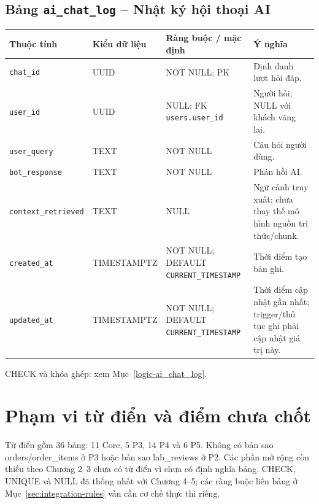\subsection{Bảng \texttt{ai\_\allowbreak{}chat\_\allowbreak{}log} -- Nhật ký hội thoại AI}
\label{dictionary-ai_chat_log}
\begingroup
\footnotesize
\setlength{\tabcolsep}{3pt}
\begin{longtable}{>{\raggedright\arraybackslash}p{3.1cm}>{\raggedright\arraybackslash}p{2.5cm}>{\raggedright\arraybackslash}p{3.7cm}>{\raggedright\arraybackslash}p{4.3cm}}
\toprule
Thuộc tính & Kiểu dữ liệu & Ràng buộc / mặc định & Ý nghĩa \\
\midrule
\endhead
\texttt{chat\_\allowbreak{}id} & UUID & NOT NULL; PK & Định danh lượt hỏi đáp. \\
\texttt{user\_\allowbreak{}id} & UUID & NULL; FK \texttt{users.user\_\allowbreak{}id} & Người hỏi; NULL với khách vãng lai. \\
\texttt{user\_\allowbreak{}query} & TEXT & NOT NULL & Câu hỏi người dùng. \\
\texttt{bot\_\allowbreak{}response} & TEXT & NOT NULL & Phản hồi AI. \\
\texttt{context\_\allowbreak{}retrieved} & TEXT & NULL & Ngữ cảnh truy xuất; chưa thay thế mô hình nguồn tri thức/chunk. \\
\texttt{created\_\allowbreak{}at} & TIMESTAMPTZ & NOT NULL; DEFAULT \texttt{CURRENT\_\allowbreak{}TIMESTAMP} & Thời điểm tạo bản ghi. \\
\texttt{updated\_\allowbreak{}at} & TIMESTAMPTZ & NOT NULL; DEFAULT \texttt{CURRENT\_\allowbreak{}TIMESTAMP} & Thời điểm cập nhật gần nhất; trigger/thủ tục ghi phải cập nhật giá trị này. \\
\bottomrule
\end{longtable}
\endgroup
CHECK và khóa ghép: xem Mục~\ref{logic-ai_chat_log}.

\section{Phạm vi từ điển và điểm chưa chốt}
Từ điển gồm 36 bảng: 11 Core, 5 P3, 14 P4 và 6 P5. Không có bản sao
orders/order\_items ở P3 hoặc bản sao lab\_reviews ở P2. Các phần mở rộng
còn thiếu theo Chương 2--3 chưa có từ điển vì chưa có định nghĩa bảng.
CHECK, UNIQUE và NULL đã thống nhất với Chương 4--5; các ràng buộc liên
bảng ở Mục~\ref{sec:integration-rules} vẫn cần cơ chế thực thi riêng.
